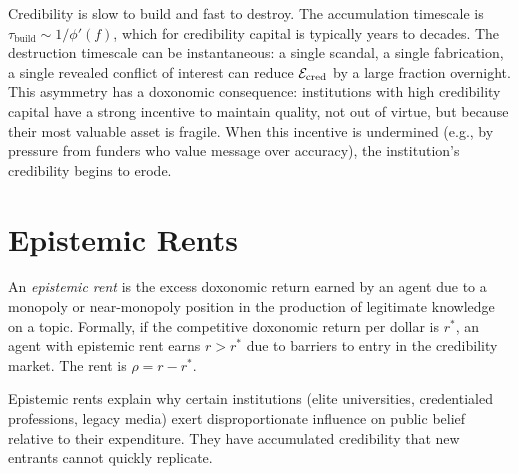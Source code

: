 \begin{remark}
\label{rem:time-asymmetry}
Credibility is slow to build and fast to destroy.
The accumulation timescale is $\tau_{\text{build}} \sim 1/\phi'(f)$, which for credibility capital is typically years to decades.
The destruction timescale can be instantaneous: a single scandal, a single fabrication, a single revealed conflict of interest can reduce $\mathcal{E}_{\text{cred}}$ by a large fraction overnight.
This asymmetry has a doxonomic consequence: institutions with high credibility capital have a strong incentive to maintain quality, not out of virtue, but because their most valuable asset is fragile.
When this incentive is undermined (e.g., by pressure from funders who value message over accuracy), the institution's credibility begins to erode.
\end{remark}


\section{Epistemic Rents}
\label{sec:ch6-rents}

\begin{definition}
\label{def:epistemic-rent}
An \emph{epistemic rent} is the excess doxonomic return earned by an agent due to a monopoly or near-monopoly position in the production of legitimate knowledge on a topic.
Formally, if the competitive doxonomic return per dollar is $r^*$, an agent with epistemic rent earns $r > r^*$ due to barriers to entry in the credibility market.
The rent is $\rho = r - r^*$.
\end{definition}

Epistemic rents explain why certain institutions (elite universities, credentialed professions, legacy media) exert disproportionate influence on public belief relative to their expenditure.
They have accumulated credibility that new entrants cannot quickly replicate.

